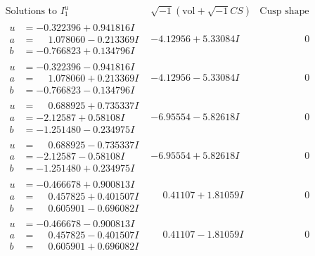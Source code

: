 \documentclass[1p]{elsarticle_modified}
\theoremstyle{definition}
\newcommand{\I}{\sqrt{-1}}
\begin{document}
$$\begin{array}{c|c|c}  
\text{Solutions to }I^u_{1}& \I (\text{vol} + \sqrt{-1}CS) & \text{Cusp shape}\\
 \hline 
\begin{aligned}
u &= -0.322396 + 0.941816 I \\
a &= \phantom{-}1.078060 - 0.213369 I \\
b &= -0.766823 + 0.134796 I\end{aligned}
 & -4.12956 + 5.33084 I & \phantom{-0.000000 } 0 \\ \hline\begin{aligned}
u &= -0.322396 - 0.941816 I \\
a &= \phantom{-}1.078060 + 0.213369 I \\
b &= -0.766823 - 0.134796 I\end{aligned}
 & -4.12956 - 5.33084 I & \phantom{-0.000000 } 0 \\ \hline\begin{aligned}
u &= \phantom{-}0.688925 + 0.735337 I \\
a &= -2.12587 + 0.58108 I \\
b &= -1.251480 - 0.234975 I\end{aligned}
 & -6.95554 - 5.82618 I & \phantom{-0.000000 } 0 \\ \hline\begin{aligned}
u &= \phantom{-}0.688925 - 0.735337 I \\
a &= -2.12587 - 0.58108 I \\
b &= -1.251480 + 0.234975 I\end{aligned}
 & -6.95554 + 5.82618 I & \phantom{-0.000000 } 0 \\ \hline\begin{aligned}
u &= -0.466678 + 0.900813 I \\
a &= \phantom{-}0.457825 + 0.401507 I \\
b &= \phantom{-}0.605901 - 0.696082 I\end{aligned}
 & \phantom{-}0.41107 + 1.81059 I & \phantom{-0.000000 } 0 \\ \hline\begin{aligned}
u &= -0.466678 - 0.900813 I \\
a &= \phantom{-}0.457825 - 0.401507 I \\
b &= \phantom{-}0.605901 + 0.696082 I\end{aligned}
 & \phantom{-}0.41107 - 1.81059 I & \phantom{-0.000000 } 0 \\ \hline\begin{aligned}

\end{aligned}
\end{array}$$
\end{document}
